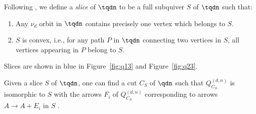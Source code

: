Following \cite[Definition 5.20]{io}, we define a \emph{slice} of $\tqdn$ to be a full subquiver $S$ of $\tqdn$ such that:
\begin{enumerate}
\item Any $\nu_{d}$ orbit in $\tqdn$ contains precisely one vertex which belongs to $S$.
\item $S$ is convex, i.e., for any path $P$ in $\tqdn$ connecting two vertices in $S$, all vertices appearing in $P$ belong to $S$.
\end{enumerate}
Slices are shown in blue in Figure~\ref{fig:q13} and Figure~\ref{fig:q23}.

Given a slice $S$ of $\tqdn$, one can find a cut $C_{S}$ of $\qdn$ such that $Q_{C_{S}}^{(d, n)}$ is isomorphic to $S$ with the arrows $F_{i}$ of $Q_{C_{S}}^{(d, n)}$ corresponding to arrows $A \to A + E_{i}$ in $S$ \cite[Theorem 5.24]{io}.
